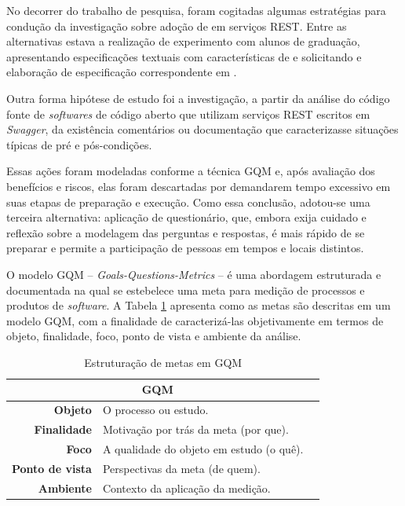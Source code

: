 No decorrer do trabalho de pesquisa, foram cogitadas algumas estratégias para
condução da investigação sobre adoção de \designbycontract{} em serviços REST.
Entre as alternativas estava a realização de experimento com alunos de
graduação, apresentando especificações textuais com características de
\designbycontract{} e solicitando e elaboração de especificação correspondente
em \neoidl{}.

Outra forma hipótese de estudo foi a investigação, a partir da análise do código
fonte de \textit{softwares} de código aberto que utilizam serviços REST escritos
em \textit{Swagger}, da existência comentários ou documentação que
caracterizasse situações típicas de pré e pós-condições. 

Essas ações foram modeladas conforme a técnica GQM\cite{basili1992software} e,
após avaliação dos benefícios e riscos, elas foram descartadas por
demandarem tempo excessivo em suas etapas de preparação e execução. Como
essa conclusão, adotou-se uma terceira alternativa: aplicação
de questionário, que, embora exija cuidado e reflexão sobre a modelagem das
perguntas e respostas, é mais rápido de se preparar e permite a participação de pessoas em tempos e locais distintos.

O modelo GQM -- \textit{Goals-Questions-Metrics} -- é uma abordagem
estruturada e documentada na qual se estebelece uma meta para medição de
processos e produtos de \textit{software}. A Tabela \ref{TabelaMetasGQM}
apresenta como as metas são descritas em um modelo GQM, com a finalidade de
caracterizá-las objetivamente em termos de objeto, finalidade, foco, ponto de
vista e ambiente da análise.

\begin{table}[h]
\centering
\vspace{0.5cm}
\begin{tabular}{r|lr}
\multicolumn{2}{c}{GQM}\\
\hline    
\textbf{Objeto} & O processo ou estudo. \\
\textbf{Finalidade}  & Motivação por trás da meta (por que). \\
\textbf{Foco} & A qualidade do objeto em estudo (o quê).\\
\textbf{Ponto de vista} & Perspectivas da meta (de quem). \\
\textbf{Ambiente} & Contexto da aplicação da medição.           
\end{tabular}
\caption{Estruturação de metas em GQM}
\label{TabelaMetasGQM}
\end{table}

